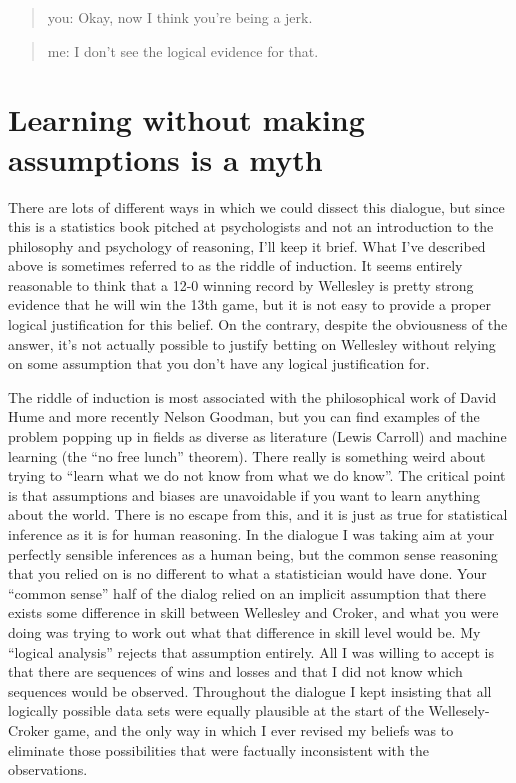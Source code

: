\documentclass[
  a4paper,
]{book}
\begin{document}
\begin{quote}
you: Okay, now I think you're being a jerk.
\end{quote}

\begin{quote}
me: I don't see the logical evidence for that.
\end{quote}

\hypertarget{learning-without-making-assumptions-is-a-myth}{%
\section*{Learning without making assumptions is a
myth}\label{learning-without-making-assumptions-is-a-myth}}


There are lots of different ways in which we could dissect this
dialogue, but since this is a statistics book pitched at psychologists
and not an introduction to the philosophy and psychology of reasoning,
I'll keep it brief. What I've described above is sometimes referred to
as the riddle of induction. It seems entirely reasonable to think that a
12-0 winning record by Wellesley is pretty strong evidence that he will
win the 13th game, but it is not easy to provide a proper logical
justification for this belief. On the contrary, despite the obviousness
of the answer, it's not actually possible to justify betting on
Wellesley without relying on some assumption that you don't have any
logical justification for.

The riddle of induction is most associated with the philosophical work
of David Hume and more recently Nelson Goodman, but you can find
examples of the problem popping up in fields as diverse as literature
(Lewis Carroll) and machine learning (the ``no free lunch'' theorem).
There really is something weird about trying to ``learn what we do not
know from what we do know''. The critical point is that assumptions and
biases are unavoidable if you want to learn anything about the world.
There is no escape from this, and it is just as true for statistical
inference as it is for human reasoning. In the dialogue I was taking aim
at your perfectly sensible inferences as a human being, but the common
sense reasoning that you relied on is no different to what a
statistician would have done. Your ``common sense'' half of the dialog
relied on an implicit assumption that there exists some difference in
skill between Wellesley and Croker, and what you were doing was trying
to work out what that difference in skill level would be. My ``logical
analysis'' rejects that assumption entirely. All I was willing to accept
is that there are sequences of wins and losses and that I did not know
which sequences would be observed. Throughout the dialogue I kept
insisting that all logically possible data sets were equally plausible
at the start of the Wellesely-Croker game, and the only way in which I
ever revised my beliefs was to eliminate those possibilities that were
factually inconsistent with the observations.
\end{document}
